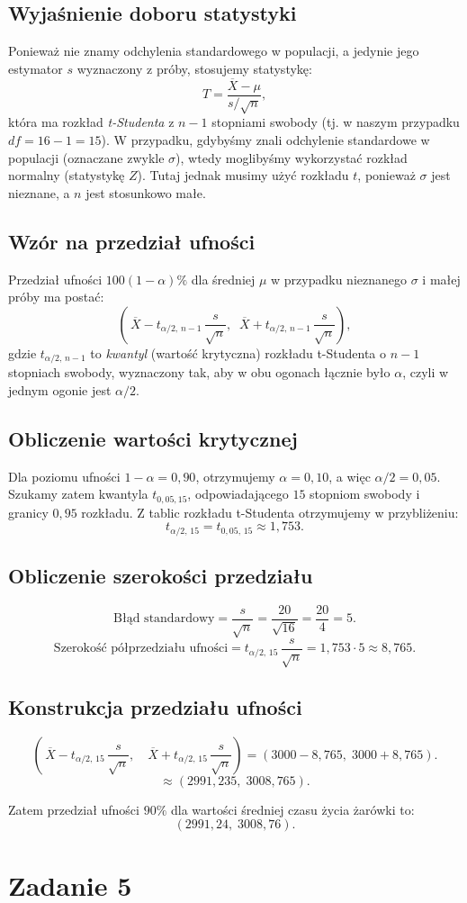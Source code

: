 \documentclass[polish, 8pt]{article}
\begin{document}
\subsection*{Wyjaśnienie doboru statystyki}
Ponieważ nie znamy odchylenia standardowego w populacji, a jedynie jego estymator $s$ wyznaczony z próby, stosujemy statystykę:
\[
T = \frac{\overline{X} - \mu}{s / \sqrt{n}},
\]
która ma rozkład \emph{t-Studenta} z $n-1$ stopniami swobody (tj. w naszym przypadku $df = 16 - 1 = 15$). 
W przypadku, gdybyśmy znali odchylenie standardowe w populacji (oznaczane zwykle $\sigma$), wtedy moglibyśmy wykorzystać rozkład normalny (statystykę $Z$). 
Tutaj jednak musimy użyć rozkładu $t$, ponieważ $\sigma$ jest nieznane, a $n$ jest stosunkowo małe.

\subsection*{Wzór na przedział ufności}
Przedział ufności $100(1-\alpha)\%$ dla średniej $\mu$ w przypadku nieznanego $\sigma$ i małej próby ma postać:
\[
\left(\,\overline{X} - t_{\alpha/2,\,n-1}\,\frac{s}{\sqrt{n}},\;\;
       \overline{X} + t_{\alpha/2,\,n-1}\,\frac{s}{\sqrt{n}} \right),
\]
gdzie $t_{\alpha/2,\,n-1}$ to \emph{kwantyl} (wartość krytyczna) rozkładu t-Studenta o $n-1$ stopniach swobody, wyznaczony tak, aby w obu ogonach łącznie było $\alpha$, czyli w jednym ogonie jest $\alpha/2$. 

\subsection*{Obliczenie wartości krytycznej}
Dla poziomu ufności $1-\alpha = 0{,}90$, otrzymujemy $\alpha = 0{,}10$, a więc $\alpha/2 = 0{,}05$. 
Szukamy zatem kwantyla $t_{0,05, 15}$, odpowiadającego $15$ stopniom swobody i granicy $0,95$ rozkładu. 
Z tablic rozkładu t-Studenta otrzymujemy w przybliżeniu:
\[
t_{\alpha/2,\,15} = t_{0,05,\,15} \approx 1{,}753.
\]

\subsection*{Obliczenie szerokości przedziału}
\[
\text{Błąd standardowy} = \frac{s}{\sqrt{n}} = \frac{20}{\sqrt{16}} = \frac{20}{4} = 5.
\]
\[
\text{Szerokość półprzedziału ufności} 
= t_{\alpha/2,\,15}\,\frac{s}{\sqrt{n}}
= 1{,}753 \cdot 5
\approx 8{,}765.
\]

\subsection*{Konstrukcja przedziału ufności}
\[
\left(\,\overline{X} - t_{\alpha/2,\,15}\,\frac{s}{\sqrt{n}},
\quad \overline{X} + t_{\alpha/2,\,15}\,\frac{s}{\sqrt{n}}\right) 
= \left(3000 - 8{,}765,\; 3000 + 8{,}765\right).
\]
\[
\approx (2991{,}235,\; 3008{,}765).
\]

Zatem przedział ufności $90\%$ dla wartości średniej czasu życia żarówki to:
\[
\boxed{
(2991{,}24,\; 3008{,}76).
}
\]
\section*{Zadanie 5}
\end{document}
